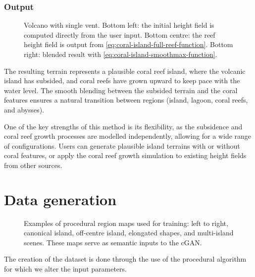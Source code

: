 \subsubsection{Output}
\label{sec:coral-island-procedural-output}

\begin{figure}
    \caption{Volcano with single vent. Bottom left: the initial height field is computed directly from the user input. Bottom centre: the reef height field is output from \cref{eq:coral-island-full-reef-function}. Bottom right: blended result with \cref{eq:coral-island-smoothmax-function}.}
    \label{fig:coral-island-volcano-example}
\end{figure}

The resulting terrain represents a plausible coral reef island, where the volcanic island has subsided, and coral reefs have grown upward to keep pace with the water level. The smooth blending between the subsided terrain and the coral features ensures a natural transition between regions (island, lagoon, coral reefs, and abysses).

One of the key strengths of this method is its flexibility, as the subsidence and coral reef growth processes are modelled independently, allowing for a wide range of configurations. Users can generate plausible island terrains with or without coral features, or apply the coral reef growth simulation to existing height fields from other sources.

\section{Data generation}
\label{sec:coral-island-dataset-generation}

\begin{figure}
    \caption{Examples of procedural region maps used for training: left to right, canonical island, off-centre island, elongated shapes, and multi-island scenes. These maps serve as semantic inputs to the cGAN.}
    \label{fig:coral-island-difficulties-dataset}
\end{figure}

The creation of the dataset is done through the use of the procedural algorithm for which we alter the input parameters.

